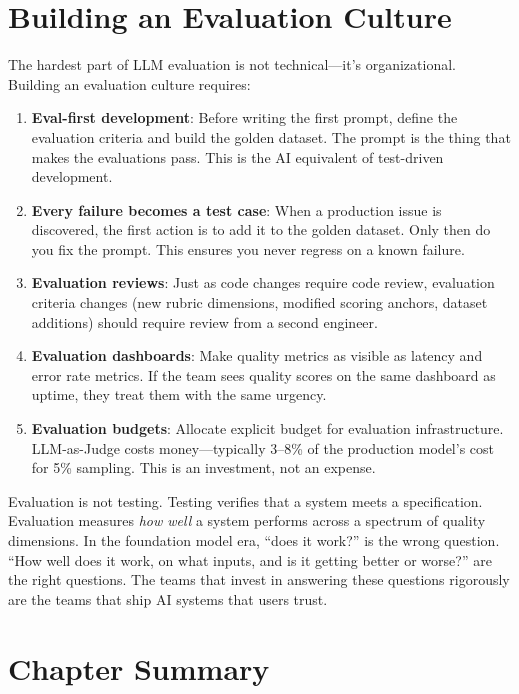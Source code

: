 \section{Building an Evaluation Culture}

The hardest part of LLM evaluation is not technical---it's organizational. Building an evaluation culture requires:

\begin{enumerate}[leftmargin=*]
    \item \textbf{Eval-first development}: Before writing the first prompt, define the evaluation criteria and build the golden dataset. The prompt is the thing that makes the evaluations pass. This is the AI equivalent of test-driven development.
    \item \textbf{Every failure becomes a test case}: When a production issue is discovered, the first action is to add it to the golden dataset. Only then do you fix the prompt. This ensures you never regress on a known failure.
    \item \textbf{Evaluation reviews}: Just as code changes require code review, evaluation criteria changes (new rubric dimensions, modified scoring anchors, dataset additions) should require review from a second engineer.
    \item \textbf{Evaluation dashboards}: Make quality metrics as visible as latency and error rate metrics. If the team sees quality scores on the same dashboard as uptime, they treat them with the same urgency.
    \item \textbf{Evaluation budgets}: Allocate explicit budget for evaluation infrastructure. LLM-as-Judge costs money---typically 3--8\% of the production model's cost for 5\% sampling. This is an investment, not an expense.
\end{enumerate}

\begin{keytakeaway}
Evaluation is not testing. Testing verifies that a system meets a specification. Evaluation measures \emph{how well} a system performs across a spectrum of quality dimensions. In the foundation model era, ``does it work?'' is the wrong question. ``How well does it work, on what inputs, and is it getting better or worse?'' are the right questions. The teams that invest in answering these questions rigorously are the teams that ship AI systems that users trust.
\end{keytakeaway}


\section{Chapter Summary}

